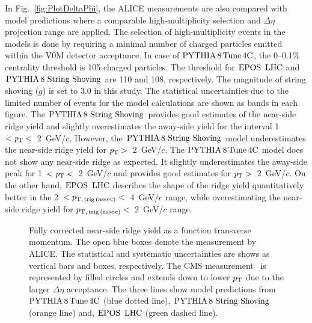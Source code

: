 In Fig.~\ref{fig:PlotDeltaPhi}, the ALICE measurements are also compared with model predictions where a comparable high-multiplicity selection and $\Delta\eta$ projection range are applied. The selection of high-multiplicity events in the models is done by requiring a minimal number of charged particles emitted within the V0M detector acceptance. In case of $\mathrm{PYTHIA}\,8\,\mathrm{Tune\,4C}$, the 0--0.1\% centrality threshold is 105 charged particles. The threshold for ${\mathrm{EPOS}\,~\mathrm{LHC}}$ and ${\mathrm{PYTHIA}\,8~\mathrm{String}~}\mathrm{Shoving}$ are 110 and 108, respectively. The magnitude of string shoving ($g$) is set to 3.0 in this study. The statistical uncertainties due to the limited number of events for the model calculations are shown as bands in each figure. The ${\mathrm{PYTHIA}\,8~\mathrm{String}~}\mathrm{Shoving}$ provides good estimates of the near-side ridge yield and slightly overestimates the away-side yield for the interval 1~$<\it{p}_{\rm{T}}<$~2~GeV/$c$. However, the ${\mathrm{PYTHIA}\,8~\mathrm{String}~}\mathrm{Shoving}$ model underestimates the near-side ridge yield for $\it{p}_{\rm{T}}>$~2~GeV/$c$. The $\mathrm{PYTHIA}\,8\,\mathrm{Tune\,4C}$ model does not show any near-side ridge as expected. It slightly underestimates the away-side peak for 1~$<\it{p}_{\rm{T}}<$~2~GeV/$c$ and provides good estimates for $\it{p}_{\rm{T}}>$~2~GeV/$c$. On the other hand, ${\mathrm{EPOS}\,~\mathrm{LHC}}$ describes the shape of the ridge yield quantitatively better in the 2~$<p_\mathrm{T,\,trig\,(assoc)}<$~4~GeV/$c$ range, while overestimating the near-side ridge yield for $p_\mathrm{T,\,trig\,(assoc)}<$~2~GeV/$c$ range. 


\begin{figure}[h!]
	\centering
	\caption{ Fully corrected near-side ridge yield as a function transverse momentum. The open blue boxes denote the measurement by ALICE. The statistical and systematic uncertainties are shows as vertical bars and boxes, respectively. The CMS measurement~\cite{Khachatryan:2015lva} is represented by filled circles and extends down to lower $p_\mathrm{T}$ due to the larger $\Delta\eta$ acceptance. The three lines show model predictions from $\mathrm{PYTHIA}\,8\,\mathrm{Tune\,4C}$ (blue dotted line), ${\mathrm{PYTHIA}\,8~\mathrm{String}~}\mathrm{Shoving}$ (orange line) and, ${\mathrm{EPOS}\,~\mathrm{LHC}}$ (green dashed line).}
	\label{fig:PlotYSpect}
\end{figure}

